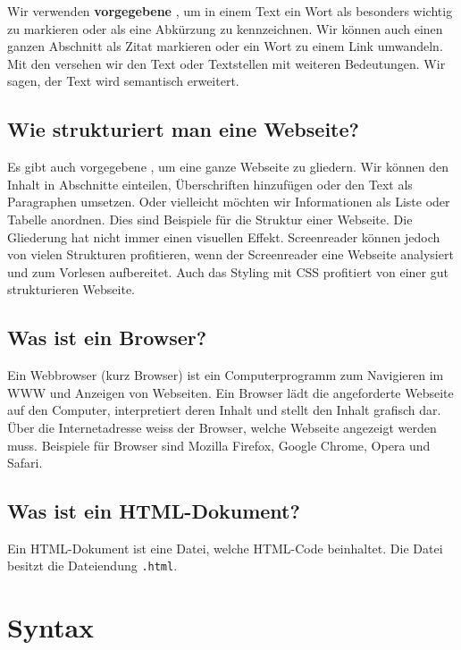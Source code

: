 Wir verwenden \textbf{vorgegebene} , um in einem Text ein Wort als besonders wichtig zu markieren oder als eine Abkürzung zu kennzeichnen. Wir können auch einen ganzen Abschnitt als Zitat markieren oder ein Wort zu einem Link umwandeln. Mit den  versehen wir den Text oder Textstellen mit weiteren Bedeutungen. Wir sagen, der Text wird semantisch erweitert.

\subsection{Wie strukturiert man eine Webseite?}

Es gibt auch vorgegebene , um eine ganze Webseite zu gliedern. Wir können den Inhalt in Abschnitte einteilen, Überschriften hinzufügen oder den Text als Paragraphen umsetzen. Oder vielleicht möchten wir Informationen als Liste oder Tabelle anordnen. Dies sind Beispiele für die Struktur einer Webseite. Die Gliederung hat nicht immer einen visuellen Effekt. Screenreader können jedoch von vielen Strukturen profitieren, wenn der Screenreader eine Webseite analysiert und zum Vorlesen aufbereitet. Auch das Styling mit \ac{CSS} profitiert von einer gut strukturieren Webseite.

\subsection{Was ist ein Browser?}

Ein Webbrowser (kurz Browser) ist ein Computerprogramm zum Navigieren im \ac{WWW} und Anzeigen von Webseiten. Ein Browser lädt die angeforderte Webseite auf den Computer, interpretiert deren Inhalt und stellt den Inhalt grafisch dar. Über die Internetadresse weiss der Browser, welche Webseite angezeigt werden muss. Beispiele für Browser sind Mozilla Firefox, Google Chrome, Opera und Safari.

\subsection{Was ist ein \acs{HTML}-Dokument?}

Ein \ac{HTML}-Dokument ist eine Datei, welche \ac{HTML}-Code beinhaltet. Die Datei besitzt die Dateiendung \texttt{.html}.

\section{Syntax}

